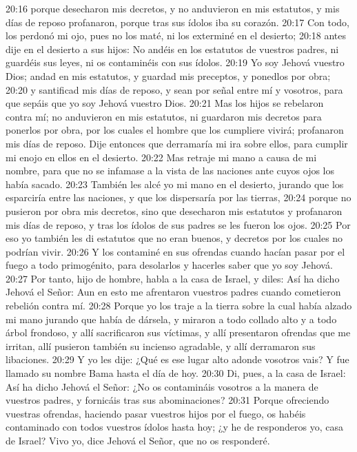 20:16 porque desecharon mis decretos, y no anduvieron en mis estatutos, y mis días de reposo profanaron, porque tras sus ídolos iba su corazón.  
20:17 Con todo, los perdonó mi ojo, pues no los maté, ni los exterminé en el desierto;  
20:18 antes dije en el desierto a sus hijos: No andéis en los estatutos de vuestros padres, ni guardéis sus leyes, ni os contaminéis con sus ídolos. 
20:19 Yo soy Jehová vuestro Dios; andad en mis estatutos, y guardad mis preceptos, y ponedlos por obra;  
20:20 y santificad mis días de reposo, y sean por señal entre mí y vosotros, para que sepáis que yo soy Jehová vuestro Dios.  
20:21 Mas los hijos se rebelaron contra mí; no anduvieron en mis estatutos, ni guardaron mis decretos para ponerlos por obra, por los cuales el hombre que los cumpliere vivirá; profanaron mis días de reposo. Dije entonces que derramaría mi ira sobre ellos, para cumplir mi enojo en ellos en el desierto.  
20:22 Mas retraje mi mano a causa de mi nombre, para que no se infamase a la vista de las naciones ante cuyos ojos los había sacado.  
20:23 También les alcé yo mi mano en el desierto, jurando que los esparciría entre las naciones, y que los dispersaría por las tierras, 
20:24 porque no pusieron por obra mis decretos, sino que desecharon mis estatutos y profanaron mis días de reposo, y tras los ídolos de sus padres se les fueron los ojos.  
20:25 Por eso yo también les di estatutos que no eran buenos, y decretos por los cuales no podrían vivir.  
20:26 Y los contaminé en sus ofrendas cuando hacían pasar por el fuego a todo primogénito, para desolarlos y hacerles saber que yo soy Jehová.  
20:27 Por tanto, hijo de hombre, habla a la casa de Israel, y diles: Así ha dicho Jehová el Señor: Aun en esto me afrentaron vuestros padres cuando cometieron rebelión contra mí.  
20:28 Porque yo los traje a la tierra sobre la cual había alzado mi mano jurando que había de dársela, y miraron a todo collado alto y a todo árbol frondoso, y allí sacrificaron sus víctimas, y allí presentaron ofrendas que me irritan, allí pusieron también su incienso agradable, y allí derramaron sus libaciones.  
20:29 Y yo les dije: ¿Qué es ese lugar alto adonde vosotros vais? Y fue llamado su nombre Bama hasta el día de hoy.  
20:30 Di, pues, a la casa de Israel: Así ha dicho Jehová el Señor: ¿No os contamináis vosotros a la manera de vuestros padres, y fornicáis tras sus abominaciones?  
20:31 Porque ofreciendo vuestras ofrendas, haciendo pasar vuestros hijos por el fuego, os habéis contaminado con todos vuestros ídolos hasta hoy; ¿y he de responderos yo, casa de Israel? Vivo yo, dice Jehová el Señor, que no os responderé.  
